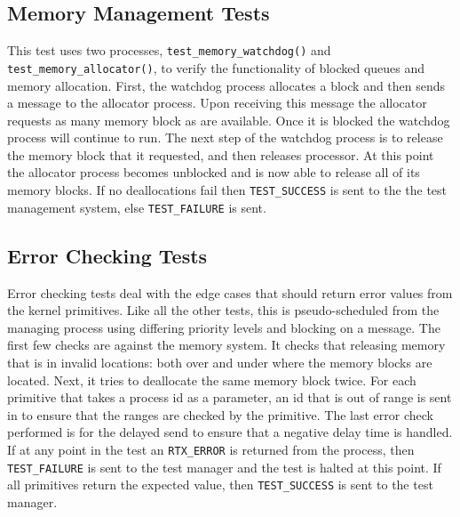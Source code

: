 \documentclass[oneside]{article}
\begin{document}
\subsection*{Memory Management Tests}
This test uses two processes, \texttt{test\_memory\_watchdog()} and
\texttt{test\_memory\_allocator()}, to verify the functionality of
blocked queues and memory allocation. First, the watchdog process
allocates a block and then sends a message to the allocator
process. Upon receiving this message the allocator requests as many
memory block as are available. Once it is blocked the watchdog process
will continue to run. The next step of the watchdog process is to
release the memory block that it requested, and then releases
processor. At this point the allocator process becomes unblocked and
is now able to release all of its memory blocks. If no deallocations
fail then \texttt{TEST\_SUCCESS} is sent to the the test management
system, else \texttt{TEST\_FAILURE} is sent.

\subsection*{Error Checking Tests}
Error checking tests deal with the edge cases that should return error
values from the kernel primitives. Like all the other tests, this is
pseudo-scheduled from the managing process using differing priority
levels and blocking on a message. The first few checks are against the
memory system. It checks that releasing memory that is in invalid
locations: both over and under where the memory blocks are
located. Next, it tries to deallocate the same memory block twice.
For each primitive that takes a process id as a parameter, an id that
is out of range is sent in to ensure that the ranges are checked by
the primitive. The last error check performed is for the delayed send
to ensure that a negative delay time is handled. If at any point in
the test an \texttt{RTX\_ERROR} is returned from the process, then
\texttt{TEST\_FAILURE} is sent to the test manager and the test is
halted at this point. If all primitives return the expected value,
then \texttt{TEST\_SUCCESS} is sent to the test manager.
\end{document}
